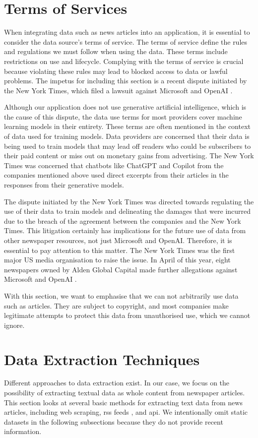 \section{Terms of Services}
\label{sec:textual-data-terms-of-services}
When integrating data such as news articles into an application, it is essential to consider the data source's terms of service. The terms of service define the rules and regulations we must follow when using the data. These terms include restrictions on use and lifecycle. Complying with the terms of service is crucial because violating these rules may lead to blocked access to data or lawful problems. The impetus for including this section is a recent dispute initiated by the New York Times, which filed a lawsuit against Microsoft and OpenAI \parencite{Stempel2023, Bergen2023}.

Although our application does not use generative artificial intelligence, which is the cause of this dispute, the data use terms for most providers cover machine learning models in their entirety. These terms are often mentioned in the context of data used for training models. Data providers are concerned that their data is being used to train models that may lead off readers who could be subscribers to their paid content or miss out on monetary gains from advertising. The New York Times was concerned that chatbots like ChatGPT and Copilot from the companies mentioned above used direct excerpts from their articles in the responses from their generative models.

The dispute initiated by the New York Times was directed towards regulating the use of their data to train models and delineating the damages that were incurred due to the breach of the agreement between the companies and the New York Times. This litigation certainly has implications for the future use of data from other newspaper resources, not just Microsoft and OpenAI. Therefore, it is essential to pay attention to this matter. The New York Times was the first major US media organisation to raise the issue. In April of this year, eight newspapers owned by Alden Global Capital made further allegations against Microsoft and OpenAI \parencite{Robertson2024, Associated_Press2024}.

With this section, we want to emphasise that we can not arbitrarily use data such as articles. They are subject to copyright, and most companies make legitimate attempts to protect this data from unauthorised use, which we cannot ignore.

\section{Data Extraction Techniques}
\label{sec:textual-data-harvesting-approaches}
Different approaches to data extraction exist. In our case, we focus on the possibility of extracting textual data as whole content from newspaper articles. This section looks at several basic methods for extracting text data from news articles, including web scraping, \acrfull{rss} feeds \parencite{rssmarco}, and \acrfull{api}. We intentionally omit static datasets in the following subsections because they do not provide recent information.

